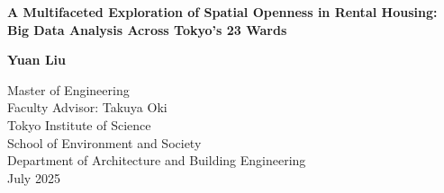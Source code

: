 \begin{titlepage}
    \begin{center}
        \vspace*{1cm}
        \Huge
        \begin{center}
            \LARGE
            \textbf{A Multifaceted Exploration of Spatial Openness in Rental Housing: Big Data Analysis Across Tokyo’s 23 Wards}
        \end{center}

 
        \vspace{1.5cm}
 
        

 
        \vfill
 
        
        \textbf{Yuan Liu}
 
        \vspace{0.8cm}
 

 
        \Large
        Master of Engineering\\
        Faculty Advisor: Takuya Oki\\
        Tokyo Institute of Science\\
        School of Environment and Society\\
        Department of Architecture and Building Engineering\\
        July 2025
 
    \end{center}
\end{titlepage}